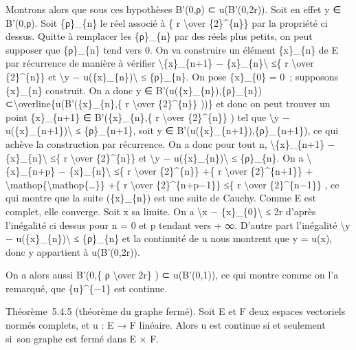 \documentclass[]{article}
\begin{document}
Montrons alors que sous ces hypothèses B'(0,ρ) ⊂ u(B'(0,2r)). Soit en
effet y ∈ B'(0,ρ). Soit \{ρ\}\_\{n\} le réel associé à \{ r
\textbackslash{}over \{2\}\^{}\{n\}\} par la propriété ci dessus. Quitte
à remplacer les \{ρ\}\_\{n\} par des réels plus petits, on peut supposer
que \{ρ\}\_\{n\} tend vers 0. On va construire un élément \{x\}\_\{n\}
de E par récurrence de manière à vérifier
\textbackslash{}\textbar{}\{x\}\_\{n+1\} −
\{x\}\_\{n\}\textbackslash{}\textbar{} ≤\{ r \textbackslash{}over
\{2\}\^{}\{n\}\} et \textbackslash{}\textbar{}y −
u(\{x\}\_\{n\})\textbackslash{}\textbar{} ≤ \{ρ\}\_\{n\}. On pose
\{x\}\_\{0\} = 0~; supposons \{x\}\_\{n\} construit. On a donc y ∈
B'(u(\{x\}\_\{n\}),\{ρ\}\_\{n\})
⊂\textbackslash{}overline\{u(B'(\{x\}\_\{n\},\{ r \textbackslash{}over
\{2\}\^{}\{n\}\} ))\} et donc on peut trouver un point \{x\}\_\{n+1\} ∈
B'(\{x\}\_\{n\},\{ r \textbackslash{}over \{2\}\^{}\{n\}\} ) tel que
\textbackslash{}\textbar{}y −
u(\{x\}\_\{n+1\})\textbackslash{}\textbar{} ≤ \{ρ\}\_\{n+1\}, soit y ∈
B'(u(\{x\}\_\{n+1\}),\{ρ\}\_\{n+1\}), ce qui achève la construction par
récurrence. On a donc pour tout n,
\textbackslash{}\textbar{}\{x\}\_\{n+1\} −
\{x\}\_\{n\}\textbackslash{}\textbar{} ≤\{ r \textbackslash{}over
\{2\}\^{}\{n\}\} et \textbackslash{}\textbar{}y −
u(\{x\}\_\{n\})\textbackslash{}\textbar{} ≤ \{ρ\}\_\{n\}. On a
\textbackslash{}\textbar{}\{x\}\_\{n+p\} −
\{x\}\_\{n\}\textbackslash{}\textbar{} ≤\{ r \textbackslash{}over
\{2\}\^{}\{n\}\} +\{ r \textbackslash{}over \{2\}\^{}\{n+1\}\} +
\textbackslash{}mathop\{\textbackslash{}mathop\{\ldots{}\}\} +\{ r
\textbackslash{}over \{2\}\^{}\{n+p−1\}\} ≤\{ r \textbackslash{}over
\{2\}\^{}\{n−1\}\} , ce qui montre que la suite (\{x\}\_\{n\}) est une
suite de Cauchy. Comme E est complet, elle converge. Soit x sa limite.
On a \textbackslash{}\textbar{}x −
\{x\}\_\{0\}\textbackslash{}\textbar{} ≤ 2r d'après l'inégalité ci
dessus pour n = 0 et p tendant vers + ∞. D'autre part l'inégalité
\textbackslash{}\textbar{}y − u(\{x\}\_\{n\})\textbackslash{}\textbar{}
≤ \{ρ\}\_\{n\} et la continuité de u nous montrent que y = u(x), donc y
appartient à u(B'(0,2r)).

On a alors aussi B'(0,\{ ρ \textbackslash{}over 2r\} ) ⊂ u(B'(0,1)), ce
qui montre comme on l'a remarqué, que \{u\}\^{}\{−1\} est continue.

Théorème~5.4.5 (théorème du graphe fermé). Soit E et F deux espaces
vectoriels normés complets, et u : E → F linéaire. Alors u est continue
si et seulement si~son graphe est fermé dans E × F.
\end{document}
